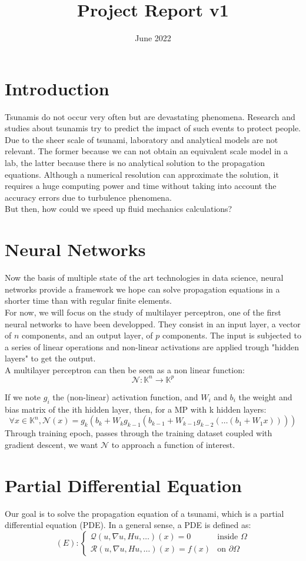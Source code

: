 \documentclass{article}
\title{Project Report v1}
\date{June 2022}
\theoremstyle{definition}
\theoremstyle{property}
\theoremstyle{remark}
\begin{document}
	\section{Introduction}
	Tsunamis do not occur very often but are devastating phenomena. Research and studies about tsunamis try to predict the impact of such events to protect people.
	Due to the sheer scale of tsunami, laboratory and analytical models are not relevant. The former because we can not obtain an equivalent scale model in a lab, the latter because there is no analytical solution to the propagation equations.
	Although a numerical resolution can approximate the solution, it requires a huge computing power and time without taking into account the accuracy errors due to turbulence phenomena.\\


	But then, how could we speed up fluid mechanics calculations?

	\section{Neural Networks}
	Now the basis of multiple state of the art technologies in data science, neural networks provide a framework we hope can solve propagation equations in a shorter time than with regular finite elements.\\
	For now, we will focus on the study of multilayer perceptron, one of the first neural networks to have been developped. They consist in an input layer, a vector of $n$ components, and an output layer, of $p$ components.
	The input is subjected to a series of linear operations and non-linear activations are applied trough "hidden layers" to get the output.\\
	A multilayer perceptron can then be seen as a non linear function:
	$$ \mathcal{N} : \mathbb{K}^n \rightarrow \mathbb{K}^p $$

	If we note $g_i$ the (non-linear) activation function, and $W_i$ and $b_i$ the weight and bias matrix of the ith hidden layer, then, for a MP with k hidden layers:
	$$ \forall x \in \mathbb{K}^n, \mathcal{N}(x) = g_k(b_k + W_k g_{k-1}(b_{k-1}+W_{k-1} g_{k-2}(\dots(b_1 + W_1 x)))) $$
	Through training epoch, passes through the training dataset coupled with gradient descent, we want $\mathcal{N}$ to approach a function of interest.

	\section{Partial Differential Equation}
	Our goal is to solve the propagation equation of a tsunami, which is a partial differential equation (PDE). In a general sense, a PDE is defined as:
	\begin{equation*}
		(E): 
		\begin{cases}
			\mathcal{Q}(u, \nabla u, H u, \dots)(x) = 0 & \text{inside $\Omega$}\\
			\mathcal{R}(u, \nabla u, H u, \dots)(x) = f(x) & \text{on $\partial \Omega$}
		\end{cases}
	\end{equation*}
\end{document}
